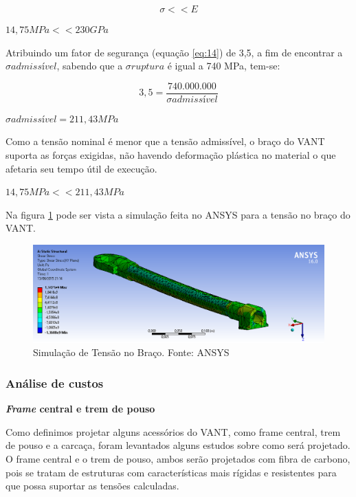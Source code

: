 \begin{equation}
  \sigma << E 
\end{equation}

\begin{center}
 $14,75 MPa << 230 GPa$
\end{center}

Atribuindo um fator de segurança (equação \ref{eq:14}) de 3,5, a fim de encontrar a
$\sigma admissível$, sabendo que a $\sigma ruptura$ é igual a 740 MPa, tem-se:

\begin{equation}
 3,5= \frac{740.000.000}{\sigma admissível}
\end{equation}

\begin{center}
 $\sigma admissível = 211,43 MPa$
\end{center}

Como a tensão nominal é menor que a tensão admissível, o braço do VANT suporta as forças exigidas, não havendo deformação plástica no material o que afetaria seu tempo útil de execução.
\begin{center}
$14,75 MPa <<  211,43 MPa$
\end{center}

Na figura \ref{fig:simulacao} pode ser vista a simulação feita no ANSYS para a tensão no braço do VANT.

\begin{figure}[H]
    \centering
      \includegraphics[keepaspectratio=true,scale=0.4]{figuras/simulacao_ansys.png}
    \caption{Simulação de Tensão no Braço. Fonte: ANSYS}
    \label{fig:simulacao}
\end{figure}

\subsubsection{Análise de custos}

\indent \textbf{\textit{Frame} central e trem de pouso}

Como definimos projetar alguns acessórios do VANT, como frame central, trem de pouso e a carcaça, foram levantados alguns estudos sobre como será projetado. O frame central e o trem de pouso, ambos serão projetados com fibra de carbono, pois se tratam de estruturas com características mais rígidas e resistentes para que possa suportar as tensões calculadas.

